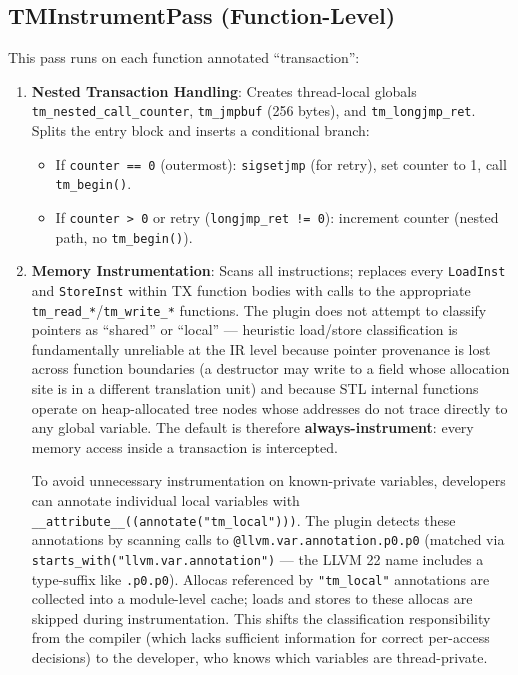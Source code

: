 \documentclass[article,12pt]{article}
\begin{document}
\subsection{TMInstrumentPass (Function-Level)}

This pass runs on each function annotated ``transaction'':

\begin{enumerate}
\item \textbf{Nested Transaction Handling}: Creates thread-local globals
  \texttt{tm\_nested\_call\_counter}, \texttt{tm\_jmpbuf} (256 bytes), and
  \texttt{tm\_longjmp\_ret}.  Splits the entry block and inserts a conditional
  branch:
  \begin{itemize}
  \item If \texttt{counter == 0} (outermost): \texttt{sigsetjmp} (for retry),
    set counter to 1, call \texttt{tm\_begin()}.
  \item If \texttt{counter > 0} or retry (\texttt{longjmp\_ret != 0}):
    increment counter (nested path, no \texttt{tm\_begin()}).
  \end{itemize}

\item \textbf{Memory Instrumentation}: Scans all instructions; replaces
  every \texttt{LoadInst} and \texttt{StoreInst} within TX function bodies
  with calls to the appropriate \texttt{tm\_read\_*}/\texttt{tm\_write\_*}
  functions.  The plugin does not attempt to classify pointers as ``shared''
  or ``local'' --- heuristic load/store classification is fundamentally
  unreliable at the IR level because pointer provenance is lost across
  function boundaries (a destructor may write to a field whose allocation
  site is in a different translation unit) and because STL internal
  functions operate on heap-allocated tree nodes whose addresses do not
  trace directly to any global variable.  The default is therefore
  \textbf{always-instrument}: every memory access inside a transaction is
  intercepted.

  To avoid unnecessary instrumentation on known-private variables,
  developers can annotate individual local variables with
  \texttt{\_\_attribute\_\_((annotate("tm\_local")))}.  The plugin
  detects these annotations by scanning calls to
  \texttt{@llvm.var.annotation.p0.p0} (matched via
  \texttt{starts\_with("llvm.var.annotation")} --- the LLVM 22 name
  includes a type-suffix like \texttt{.p0.p0}).  Allocas referenced by
  \texttt{"tm\_local"} annotations are collected into a module-level
  cache; loads and stores to these allocas are skipped during
  instrumentation.  This shifts the classification responsibility from
  the compiler (which lacks sufficient information for correct per-access
  decisions) to the developer, who knows which variables are
  thread-private.


\end{enumerate}
\end{document}
